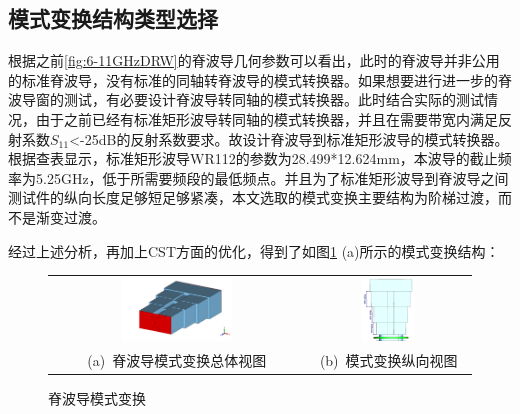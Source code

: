 \documentclass[master]{thesis-uestc}
\begin{document}
\subsection{模式变换结构类型选择}
根据之前\ref{fig:6-11GHzDRW}的脊波导几何参数可以看出，此时的脊波导并非公用的标准脊波导，没有标准的同轴转脊波导的模式转换器。如果想要进行进一步的脊波导窗的测试，有必要设计脊波导转同轴的模式转换器。此时结合实际的测试情况，由于之前已经有标准矩形波导转同轴的模式转换器，并且在需要带宽内满足反射系数$S_{11}$<-25dB的反射系数要求。故设计脊波导到标准矩形波导的模式转换器。根据查表显示，标准矩形波导WR112的参数为28.499*12.624mm，本波导的截止频率为5.25GHz，低于所需要频段的最低频点。并且为了标准矩形波导到脊波导之间测试件的纵向长度足够短足够紧凑，本文选取的模式变换主要结构为阶梯过渡，而不是渐变过渡。

经过上述分析，再加上CST方面的优化，得到了如图\ref{fig:脊波导模式变换} (a)所示的模式变换结构：

\begin{figure}[!htb]
    \small
    \centering
    \begin{tabular}{@{\ }c@{\ }c}
        \includegraphics[width=0.45\textwidth]{pic/chapter3/脊波导模式变换.png} & 
        \hspace{5pt}
        \includegraphics[width=0.35\textwidth]{pic/chapter3/模式变换纵向长度.png}     \\
        \mbox{\small (a) 脊波导模式变换总体视图}                                                                               & 
        \mbox{\small (b) 模式变换纵向视图}                                                                                  \\
    \end{tabular}
    \caption{脊波导模式变换}
    \label{fig:脊波导模式变换}
\end{figure}
\end{document}
